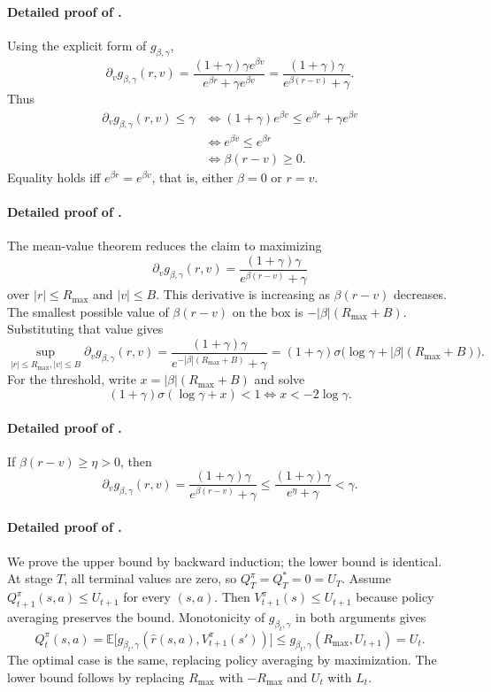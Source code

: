 \documentclass{article}
\theoremstyle{remark}
\newcommand{\E}{\mathbb{E}}
\begin{document}
\paragraph{Detailed proof of .}
Using the explicit form of $g_{\beta,\gamma}$,
\[
\partial_v g_{\beta,\gamma}(r,v)=\frac{(1+\gamma)\gamma e^{\beta v}}{e^{\beta r}+\gamma e^{\beta v}}=\frac{(1+\gamma)\gamma}{e^{\beta(r-v)}+\gamma}.
\]
Thus
\begin{align*}
\partial_v g_{\beta,\gamma}(r,v)\le \gamma
&\iff (1+\gamma)e^{\beta v}\le e^{\beta r}+\gamma e^{\beta v}\\
&\iff e^{\beta v}\le e^{\beta r}\\
&\iff \beta(r-v)\ge 0.
\end{align*}
Equality holds iff $e^{\beta r}=e^{\beta v}$, that is, either $\beta=0$ or $r=v$.

\paragraph{Detailed proof of .}
The mean-value theorem reduces the claim to maximizing
\[
\partial_v g_{\beta,\gamma}(r,v)=\frac{(1+\gamma)\gamma}{e^{\beta(r-v)}+\gamma}
\]
over $|r|\le R_{\max}$ and $|v|\le B$.
This derivative is increasing as $\beta(r-v)$ decreases.
The smallest possible value of $\beta(r-v)$ on the box is $-|\beta|(R_{\max}+B)$.
Substituting that value gives
\[
\sup_{|r|\le R_{\max},|v|\le B}\partial_v g_{\beta,\gamma}(r,v)
=
\frac{(1+\gamma)\gamma}{e^{-|\beta|(R_{\max}+B)}+\gamma}
=(1+\gamma)\sigma\!\bigl(\log\gamma+|\beta|(R_{\max}+B)\bigr).
\]
For the threshold, write $x=|\beta|(R_{\max}+B)$ and solve
\[
(1+\gamma)\sigma(\log\gamma+x)<1
\iff x<-2\log\gamma.
\]

\paragraph{Detailed proof of .}
If $\beta(r-v)\ge \eta>0$, then
\[
\partial_v g_{\beta,\gamma}(r,v)=\frac{(1+\gamma)\gamma}{e^{\beta(r-v)}+\gamma}\le \frac{(1+\gamma)\gamma}{e^{\eta}+\gamma}<\gamma.
\]

\paragraph{Detailed proof of .}
We prove the upper bound by backward induction; the lower bound is identical.
At stage $T$, all terminal values are zero, so $Q_T^\pi=Q_T^*=0=U_T$.
Assume $Q_{t+1}^\pi(s,a)\le U_{t+1}$ for every $(s,a)$.
Then $V_{t+1}^\pi(s)\le U_{t+1}$ because policy averaging preserves the bound.
Monotonicity of $g_{\beta_t,\gamma}$ in both arguments gives
\[
Q_t^\pi(s,a)=\E\bigl[g_{\beta_t,\gamma}(\hat r(s,a),V_{t+1}^\pi(s'))\bigr]\le g_{\beta_t,\gamma}(R_{\max},U_{t+1})=U_t.
\]
The optimal case is the same, replacing policy averaging by maximization.
The lower bound follows by replacing $R_{\max}$ with $-R_{\max}$ and $U_t$ with $L_t$.
\end{document}
